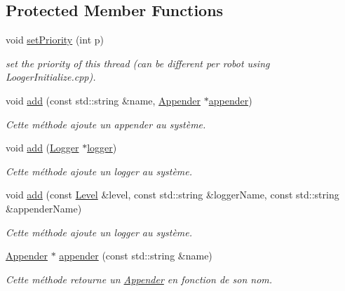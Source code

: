 \subsection*{Protected Member Functions}
\begin{DoxyCompactItemize}
\item 
\mbox{\label{classlogs_1_1LoggerFactory_acee0ef15a4f8c1bfa8168d7085dff706}} 
void \hyperlink{classlogs_1_1LoggerFactory_acee0ef15a4f8c1bfa8168d7085dff706}{set\+Priority} (int p)
\begin{DoxyCompactList}\small\item\em set the priority of this thread (can be different per robot using Looger\+Initialize.\+cpp). \end{DoxyCompactList}\item 
void \hyperlink{classlogs_1_1LoggerFactory_ac89f19c0ffd71aa8cdc1c2d44c03809e}{add} (const std\+::string \&name, \hyperlink{classlogs_1_1Appender}{Appender} $\ast$\hyperlink{classlogs_1_1LoggerFactory_a75823b27a156f58a8d4061453a632c66}{appender})
\begin{DoxyCompactList}\small\item\em Cette méthode ajoute un appender au système. \end{DoxyCompactList}\item 
void \hyperlink{classlogs_1_1LoggerFactory_a4a5dc780d448355be6eb117ed9a42a8b}{add} (\hyperlink{classlogs_1_1Logger}{Logger} $\ast$\hyperlink{classlogs_1_1LoggerFactory_a82585b5de73e471e06cafdccc3b3721e}{logger})
\begin{DoxyCompactList}\small\item\em Cette méthode ajoute un logger au système. \end{DoxyCompactList}\item 
void \hyperlink{classlogs_1_1LoggerFactory_a030b1b4309b60b662340faa0dad2ca1e}{add} (const \hyperlink{classlogs_1_1Level}{Level} \&level, const std\+::string \&logger\+Name, const std\+::string \&appender\+Name)
\begin{DoxyCompactList}\small\item\em Cette méthode ajoute un logger au système. \end{DoxyCompactList}\item 
\hyperlink{classlogs_1_1Appender}{Appender} $\ast$ \hyperlink{classlogs_1_1LoggerFactory_a75823b27a156f58a8d4061453a632c66}{appender} (const std\+::string \&name)
\begin{DoxyCompactList}\small\item\em Cette méthode retourne un \hyperlink{classlogs_1_1Appender}{Appender} en fonction de son nom. \end{DoxyCompactList}\end{DoxyCompactItemize}
